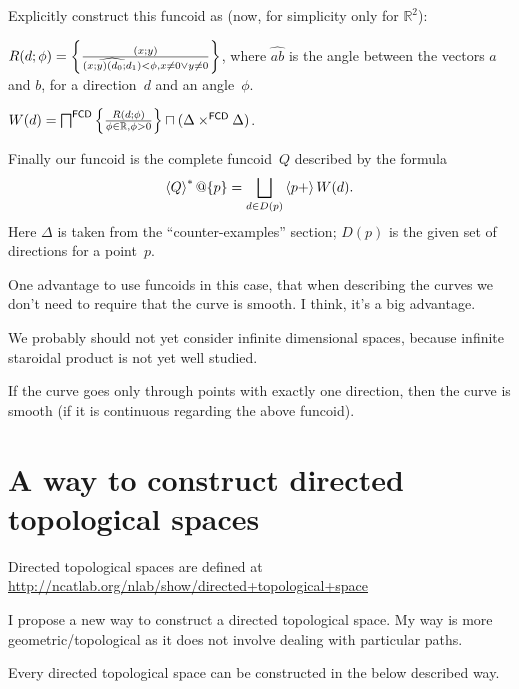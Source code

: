 Explicitly construct this funcoid as (now, for simplicity only for $\mathbb{R}^2$):

$R(d;\phi) = \left\{ \frac{(x;y)}{\widehat{(x;y)(d_0;d_1)}<\phi, x\ne 0\lor y\ne 0}\right\}$,
where $\widehat{ab}$ is the angle between the vectors $a$ and $b$,
for a direction~$d$ and an angle~$\phi$.

$W(d) = \bigsqcap^{\mathsf{FCD}}\left\{ \frac{R(d;\phi)}{\phi\in\mathbb{R},\phi>0}\right\} \sqcap (\Delta\times^{\mathsf{FCD}}\Delta)$.

Finally our funcoid is the complete funcoid~$Q$ described by the formula
\[ \left\langle Q\right\rangle ^{\ast}@\{p\} = \bigsqcup_{d\in D(p)} \left\langle p+\right\rangle W(d). \]
Here $\Delta$ is taken from the ``counter-examples'' section;
$D(p)$ is the given set of directions for a point~$p$.

One advantage to use funcoids in this case, that when describing the curves we don't need to require that the curve is smooth. I think, it's a big advantage.

 We probably should not yet consider infinite dimensional spaces,
because infinite staroidal product is not yet well studied.

\begin{conjecture}
If the curve goes only through points with exactly one direction, then the curve is smooth (if it is continuous regarding the above funcoid).
\end{conjecture}

\section{A way to construct directed topological spaces}


Directed topological spaces are defined at\\
\url{http://ncatlab.org/nlab/show/directed+topological+space}

I propose a new way to construct a directed topological space. My way is more geometric/topological as it does not involve dealing with particular paths.

\begin{conjecture}
Every directed topological space can be constructed in the below described way.
\end{conjecture}

